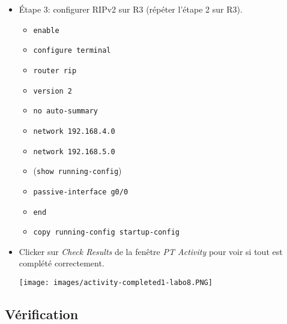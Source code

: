 \documentclass[a4paper]{article}
\begin{document}
\begin{itemize}
\item Étape 3: configurer RIPv2 sur R3 (répéter l'étape 2 sur R3).
\begin{example}
    \begin{itemize}
        \item \texttt{enable}
        \item \texttt{configure terminal}
        \item \texttt{router rip}

        \item \texttt{version 2}
        \item \texttt{no auto-summary}

        \item \texttt{network 192.168.4.0}
        \item \texttt{network 192.168.5.0}

        \item (\texttt{show running-config})
        \item \texttt{passive-interface g0/0}

        \item \texttt{end}
        \item \texttt{copy running-config startup-config}
    \end{itemize}
\end{example}





\item Clicker sur \textit{Check Results} de la fenêtre \textit{PT Activity} pour voir si tout est complété correctement.
\begin{center}
    \texttt{[image: images/activity-completed1-labo8.PNG]}
\end{center}





\end{itemize}










\subsection{Vérification}
\end{document}
